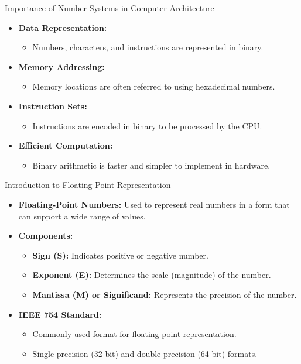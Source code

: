 \documentclass[aspectratio=169]{beamer}
\begin{document}
\begin{frame}{Importance of Number Systems in Computer Architecture}
    \begin{itemize}
        \item \textbf{Data Representation:} 
        \begin{itemize}
            \item Numbers, characters, and instructions are represented in binary.
        \end{itemize}
        \item \textbf{Memory Addressing:} 
        \begin{itemize}
            \item Memory locations are often referred to using hexadecimal numbers.
        \end{itemize}
        \item \textbf{Instruction Sets:} 
        \begin{itemize}
            \item Instructions are encoded in binary to be processed by the CPU.
        \end{itemize}
        \item \textbf{Efficient Computation:} 
        \begin{itemize}
            \item Binary arithmetic is faster and simpler to implement in hardware.
        \end{itemize}
    \end{itemize}
\end{frame}

\begin{frame}{Introduction to Floating-Point Representation}
    \begin{itemize}
        \item \textbf{Floating-Point Numbers:} Used to represent real numbers in a form that can support a wide range of values.
        \item \textbf{Components:}
        \begin{itemize}
            \item \textbf{Sign (S):} Indicates positive or negative number.
            \item \textbf{Exponent (E):} Determines the scale (magnitude) of the number.
            \item \textbf{Mantissa (M) or Significand:} Represents the precision of the number.
        \end{itemize}
        \item \textbf{IEEE 754 Standard:}
        \begin{itemize}
            \item Commonly used format for floating-point representation.
            \item Single precision (32-bit) and double precision (64-bit) formats.
        \end{itemize}
    \end{itemize}
\end{frame}
\end{document}

